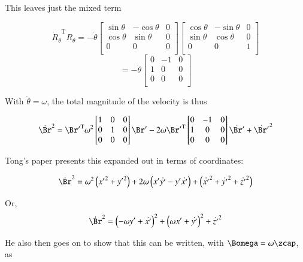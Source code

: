 \documentclass{article}      %
\newcommand{\dt}[1]{\dot{#1}}
\newcommand{\transpose}[1]{{#1}^{\text{T}}}
\begin{document}
This leaves just the mixed term

\[
\transpose{\dt{R}_{\theta}} {R_{\theta}}
=
-{\dt{\theta}}
\begin{bmatrix}
\sin \theta & -\cos \theta & 0 \\
\cos \theta & \sin \theta & 0 \\
0 & 0 & 0 \\
\end{bmatrix}
\begin{bmatrix}
\cos \theta & -\sin \theta & 0 \\
\sin \theta & \cos \theta & 0 \\
0 & 0 & 1 \\
\end{bmatrix}
\]
\[
=
-{\dt{\theta}}
\begin{bmatrix}
0 & -1 & 0 \\
1 & 0 & 0 \\
0 & 0 & 0 \\
\end{bmatrix}
\]

With $\dt{\theta} = \omega$, the total magnitude of the velocity is thus

\[
\dt{\Br}^2 = 
\transpose{\Br'} 
\omega^2
\begin{bmatrix}
1 & 0 & 0 \\
0 & 1 & 0 \\
0 & 0 & 0 \\
\end{bmatrix}
\Br'
-2 \omega \transpose{{\Br'}} 
\begin{bmatrix}
0 & -1 & 0 \\
1 & 0 & 0 \\
0 & 0 & 0 \\
\end{bmatrix}
\dt{\Br'}
+ {\dt{\Br'}}^2
\]

Tong's paper presents this expanded out in terms of coordinates:

\[
\dt{\Br}^2 = 
\omega^2\left( {x'}^{2} + {y'}^{2} \right)
+ 2 \omega \left( x' \dt{y'} -y' \dt{x'} \right)
+ \left( \dt{x'}^{2} + \dt{y'}^{2} + \dt{z'}^{2} \right)
\]

Or,
\begin{equation}\label{eqn:vmagwithmatrix}
\dt{\Br}^2 = 
\left( -\omega y' + \dt{x'} \right)^2 
+\left( \omega x' + \dt{y'} \right)^2 
+ \dt{z'}^2 
\end{equation}

He also then goes on to
show that this can be written, with $\Bomega = \omega \zcap$, as 
\end{document}
